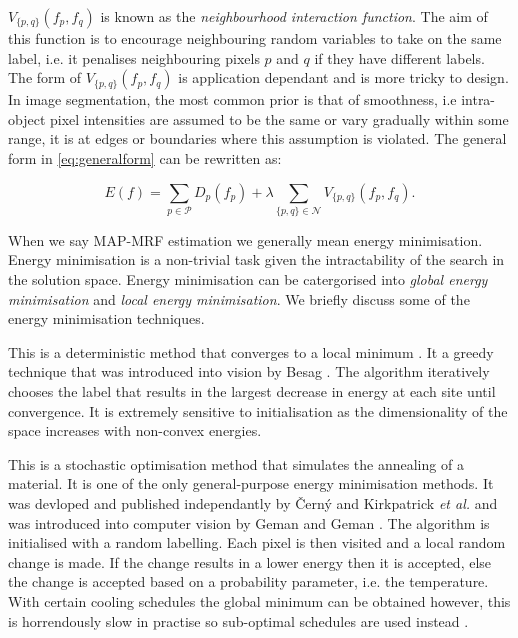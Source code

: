 $V_{\{p,q\}}(f_p,f_q)$ is known as the \textit{neighbourhood interaction function}.
The aim of this function is to encourage neighbouring random variables to take on the same label, i.e. it penalises neighbouring pixels $p$ and $q$ if they have different labels.
The form of $V_{\{p,q\}}(f_p,f_q)$ is application dependant and is more tricky to design.
In image segmentation, the most common prior is that of smoothness, i.e intra-object pixel intensities are assumed to be the same or vary gradually within some range, it is at edges or boundaries where this assumption is violated.
The general form in \autoref{eq:generalform} can be rewritten as:

\begin{equation}
	E(f) = \sum_{p \in \mathcal{P}}D_p(f_p) + \lambda \sum_{\{p,q\} \in \mathcal{N}}V_{\{p,q\}}(f_p,f_q).
	\label{eq:generalformexpanded}
\end{equation}
 
 When we say MAP-MRF estimation we generally mean energy minimisation.
 Energy minimisation is a non-trivial task given the intractability of the search in the solution space.
 Energy minimisation can be catergorised into \textit{global energy minimisation} and \textit{local energy minimisation}.
 We briefly discuss some of the energy minimisation techniques.
 
\begin{definition}
	This is a deterministic method that converges to a local minimum \citep{Cassisa2010}.
	It a greedy technique that was introduced into vision by Besag \citep{Besag1986,Veksler1999}.
	The algorithm iteratively chooses the label that results in the largest decrease in energy at each site until convergence.
	It is extremely sensitive to initialisation as the dimensionality of the space increases with non-convex energies.
\end{definition}
 
\begin{definition}
	This is a stochastic optimisation method that simulates the annealing of a material.
	It is one of the only general-purpose energy minimisation methods.
	It was devloped and published independantly by \v{C}ern{\'y} \citep{Cerny1985} and Kirkpatrick \textit{et al.} \citep{Kirkpatrick1983} and was introduced into computer vision by Geman and Geman \citep{Geman1984}.
	The algorithm is initialised with a random labelling.
	Each pixel is then visited and a local random change is made.
	If the change results in a lower energy then it is accepted, else the change is accepted based on a probability parameter, i.e. the temperature.
	With certain cooling schedules the global minimum can be obtained however, this is horrendously slow in practise so sub-optimal schedules are used instead \citep{Geman1984}.
\end{definition}

